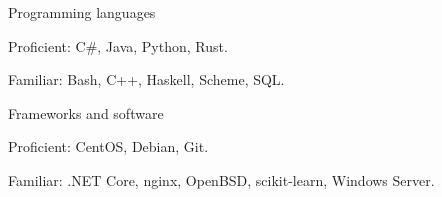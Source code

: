 
\begin{cventries}
  \cventry
    {} %
    {Programming languages} %
    {}
    {}
    {
      \begin{cvitems} %
         \item {Proficient: C\#, Java, Python, Rust.}
         \vspace{0.5mm}
         \item {Familiar: Bash, C++, Haskell, Scheme, SQL.}
      \end{cvitems}
    }
    
  \cventry
    {} %
    {Frameworks and software} %
    {}
    {}
    {
      \begin{cvitems} %
         \item {Proficient: CentOS, Debian, Git.}
         \vspace{0.5mm}
         \item {Familiar: .NET Core, nginx, OpenBSD, scikit-learn, Windows Server.}
      \end{cvitems}
    }
\end{cventries}

